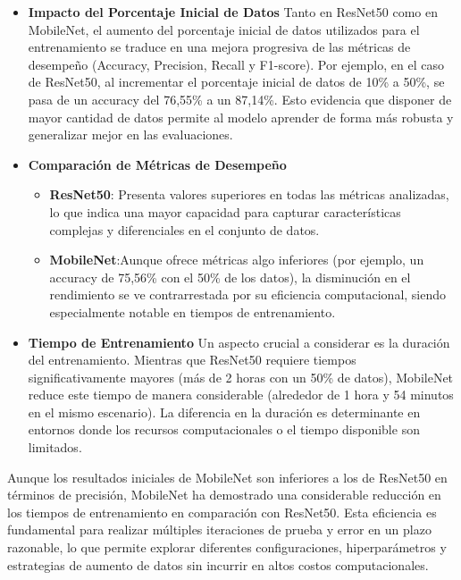 \begin{itemize}
    \item\textbf{Impacto del Porcentaje Inicial de Datos}
          Tanto en ResNet50 como en MobileNet, el aumento del porcentaje inicial de datos utilizados para el entrenamiento se
          traduce en una mejora progresiva de las métricas de desempeño (Accuracy, Precision, Recall y F1-score).
          Por ejemplo, en el caso de ResNet50, al incrementar el porcentaje inicial de datos de 10\% a 50\%, se pasa de un
          accuracy del 76,55\% a un 87,14\%.
          Esto evidencia que disponer de mayor cantidad de datos permite al modelo aprender de forma más robusta y generalizar
          mejor en las evaluaciones.


    \item\textbf{Comparación de Métricas de Desempeño}
          \begin{itemize}
              \item \textbf{ResNet50}: Presenta valores superiores en todas las métricas analizadas, lo que indica una mayor
                    capacidad para capturar características complejas y diferenciales en el conjunto de datos.
              \item \textbf{MobileNet}:Aunque ofrece métricas algo inferiores (por ejemplo, un accuracy de 75,56\% con el 50\% de
                    los datos), la disminución en el rendimiento se ve contrarrestada por su eficiencia computacional, siendo
                    especialmente notable en tiempos de entrenamiento.
          \end{itemize}

    \item\textbf{Tiempo de Entrenamiento}
          Un aspecto crucial a considerar es la duración del entrenamiento.
          Mientras que ResNet50 requiere tiempos significativamente mayores (más de 2 horas con un 50\% de datos), MobileNet
          reduce este tiempo de manera considerable (alrededor de 1 hora y 54 minutos en el mismo escenario).
          La diferencia en la duración es determinante en entornos donde los recursos computacionales o el tiempo disponible son
          limitados.
\end{itemize}

Aunque los resultados iniciales de MobileNet son inferiores a los de ResNet50 en términos de precisión, MobileNet ha
demostrado una considerable reducción en los tiempos de entrenamiento en comparación con ResNet50.
Esta eficiencia es fundamental para realizar múltiples iteraciones de prueba y error en un plazo razonable, lo que
permite explorar diferentes configuraciones, hiperparámetros y estrategias de aumento de datos sin incurrir en altos
costos computacionales.

